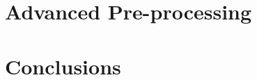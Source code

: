 \documentclass[12pt]{article}
\begin{document}


\section{Advanced Pre-processing}

\section{Conclusions}







\newpage



\end{document}
